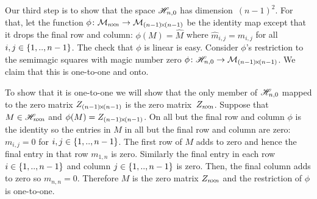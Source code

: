 Our third step is to show that the space 
$\mathscr{H}_{n,0}$ has dimension~$(n-1)^2$.
For that,
let the function $\mbox{$\phi\colon \mathcal{M}_{n \! \times \! n}\to \mathcal{M}_{(n-1) \! \times \! (n-1)}$}$
be the identity map except that it 
drops the final row and column: $\phi(M)=\hat{M}$ where 
$\hat{m}_{i,j}=m_{i,j}$ for all $i,j\in\mbox{$\{1,..,n-1\}$}$.
The check that $\phi$ is linear is easy.
Consider $\phi$'s restriction to the semimagic squares with 
magic number zero
$\mbox{$\phi\colon \mathscr{H}_{n,0}\to \mathcal{M}_{(n-1) \! \times \! (n-1)}$}$.
We claim that this is one-to-one and onto.

To show that it is one-to-one we will show that the only member of 
$\mathscr{H}_{n,0}$ mapped to the zero matrix $Z_{(n-1) \! \times \! (n-1)}$
is the zero matrix~$Z_{n \! \times \! n}$.
Suppose that $M\in\mathscr{H}_{n \! \times \! n}$ and $\phi(M)=Z_{(n-1) \! \times \! (n-1)}$.
On all but the final row and column $\phi$ is the identity so
the entries in $M$ in all but the final row and column are zero: 
$m_{i,j}=0$ for $i,j\in\mbox{$\{1,..,n-1\}$}$.
The first row of $M$ adds to zero and hence
the final entry in that row $m_{1,n}$ is zero.
Similarly the final entry in each row $i\in\mbox{$\{1,..,n-1\}$}$
and column $j\in\mbox{$\{1,..,n-1\}$}$ is zero.
Then, the final column adds to zero so $m_{n,n}=0$.
Therefore $M$ is the zero matrix $Z_{n \! \times \! n}$ and the restriction of $\phi$ 
is one-to-one. 

